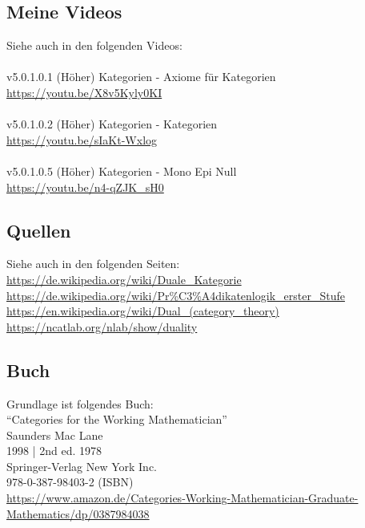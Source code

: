 \documentclass[a4paper]{amsart}
\theoremstyle{definition}
\begin{document}
\subsection*{Meine Videos}
Siehe auch in den folgenden Videos:\\
\\
v5.0.1.0.1 (Höher) Kategorien - Axiome für Kategorien\\
\url{https://youtu.be/X8v5Kyly0KI}\\
\\
v5.0.1.0.2 (Höher) Kategorien - Kategorien\\
\url{https://youtu.be/sIaKt-Wxlog}\\
\\
v5.0.1.0.5 (Höher) Kategorien - Mono Epi Null\\
\url{https://youtu.be/n4-qZJK_sH0}

\subsection*{Quellen}
Siehe auch in den folgenden Seiten:\\
\url{https://de.wikipedia.org/wiki/Duale_Kategorie}\\
\url{https://de.wikipedia.org/wiki/Pr%C3%A4dikatenlogik_erster_Stufe}\\
\url{https://en.wikipedia.org/wiki/Dual_(category_theory)}\\
\url{https://ncatlab.org/nlab/show/duality}

\subsection*{Buch}
Grundlage ist folgendes Buch:\\
"`Categories for the Working Mathematician"'\\
Saunders Mac Lane\\
1998 | 2nd ed. 1978\\
Springer-Verlag New York Inc.\\
978-0-387-98403-2 (ISBN)\\
{\tiny
   \url{https://www.amazon.de/Categories-Working-Mathematician-Graduate-Mathematics/dp/0387984038}}\\
\end{document}
